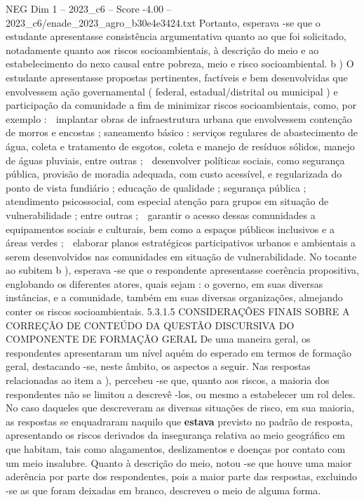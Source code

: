 \begin{textsample}{NEG Dim 1 – 2023\_c6 – Score -4.00 – 2023\_c6/enade\_2023\_agro\_b30e4e3424.txt}
Portanto, esperava -se que o estudante apresentasse consistência argumentativa quanto ao que foi solicitado, notadamente quanto aos riscos socioambientais, à descrição do meio e ao estabelecimento do nexo causal entre pobreza, meio e risco socioambiental. b ) O estudante apresentasse propostas pertinentes, factíveis e bem desenvolvidas que envolvessem ação governamental ( federal, estadual/distrital ou municipal ) e participação da comunidade a fim de minimizar riscos socioambientais, como, por exemplo :  implantar obras de infraestrutura urbana que envolvessem contenção de morros e encostas ; saneamento básico : serviços regulares de abastecimento de água, coleta e tratamento de esgotos, coleta e manejo de resíduos sólidos, manejo de águas pluviais, entre outras ;  desenvolver políticas sociais, como segurança pública, provisão de moradia adequada, com custo acessível, e regularizada do ponto de vista fundiário ; educação de qualidade ; segurança pública ; atendimento psicossocial, com especial atenção para grupos em situação de vulnerabilidade ; entre outras ;  garantir o acesso dessas comunidades a equipamentos sociais e culturais, bem como a espaços públicos inclusivos e a áreas verdes ;  elaborar planos estratégicos participativos urbanos e ambientais a serem desenvolvidos nas comunidades em situação de vulnerabilidade.
No tocante ao subitem b ), esperava -se que o respondente apresentasse coerência propositiva, englobando os diferentes atores, quais sejam : o governo, em suas diversas instâncias, e a comunidade, também em suas diversas organizações, almejando conter os riscos socioambientais. 5.3.1.5 CONSIDERAÇÕES FINAIS SOBRE A CORREÇÃO DE CONTEÚDO DA QUESTÃO DISCURSIVA DO COMPONENTE DE FORMAÇÃO GERAL De uma maneira geral, os respondentes apresentaram um nível aquém do esperado em termos de formação geral, destacando -se, neste âmbito, os aspectos a seguir.
Nas respostas relacionadas ao item a ), percebeu -se que, quanto aos riscos, a maioria dos respondentes não se limitou a descrevê -los, ou mesmo a estabelecer um rol deles.
No caso daqueles que descreveram as diversas situações de risco, em sua maioria, as respostas se enquadraram naquilo que \textbf{estava} previsto no padrão de resposta, apresentando os riscos derivados da insegurança relativa ao meio geográfico em que habitam, tais como alagamentos, deslizamentos e doenças por contato com um meio insalubre.
Quanto à descrição do meio, notou -se que houve uma maior aderência por parte dos respondentes, pois a maior parte das respostas, excluindo -se as que foram deixadas em branco, descreveu o meio de alguma forma.

\end{textsample}
